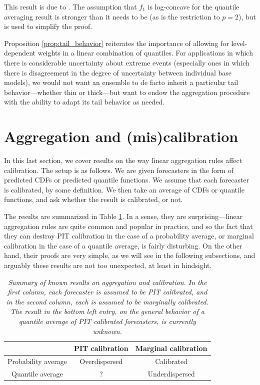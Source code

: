 \documentclass{article}
\begin{document}
This result is due to \citet{fakoor2021flexible}. The assumption that $f_1$ is
log-concave for the quantile averaging result is stronger than it needs to be
(as is the restriction to $p=2$), but is used to simplify the proof. 

Proposition \ref{prop:tail_behavior} reiterates the importance of allowing for
level-dependent weights in a linear combination of quantiles. For applications
in which there is considerable uncertainty about extreme events (especially ones
in which there is disagreement in the degree of uncertainty between individual
base models), we would not want an ensemble to de facto inherit a particular
tail behavior---whether thin or thick---but want to endow the aggregation
procedure with the ability to adapt its tail behavior as needed.

\section{Aggregation and (mis)calibration}
\label{sec:aggr_calib}

In this last section, we cover results on the way linear aggregation rules
affect calibration. The setup is as follows. We are given forecasters in the
form of predicted CDFs or predicted quantile functions. We assume that each
forecaster is calibrated, by some definition. We then take an average of CDFs or
quantile functions, and ask whether the result is calibrated, or not.

The results are summarized in Table \ref{tab:aggr_calib}. In a sense, they are
surprising---linear aggregation rules are quite common and popular in practice,
and so the fact that they can destroy PIT calibration in the case of a probability 
average, or marginal calibration in the case of a quantile average, is fairly
disturbing. On the other hand, their proofs are very simple, as we will see in
the following subsections, and arguably these results are not too unexpected, at
least in hindsight. 

\begin{table}[htb]
\centering
\begin{tabular}{c|c|c}
& PIT calibration & Marginal calibration \\
\hline
Probability average & Overdispersed & Calibrated \\
\hline
Quantile average & ? & Underdispersed 
\end{tabular}
\caption{\it Summary of known results on aggregation and calibration. In the
  first column, each forecaster is assumed to be PIT calibrated, and in the
  second column, each is assumed to be marginally calibrated. The result in the
  bottom left entry, on the general behavior of a quantile average of PIT
  calibrated forecasters, is currently unknown.} 
\label{tab:aggr_calib}
\end{table}
\end{document}
